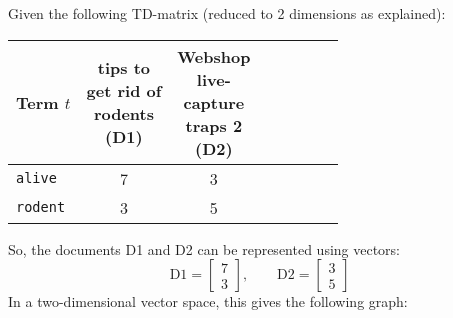         		Given the following TD-matrix (reduced to 2 dimensions as explained):
                \begin{table}[H]
                    \centering
                    \begin{tabular}{|l|c|c|c|c|c|c|c|}
                        \hline
                        \textbf{Term} \(t\) & \makecell{tips to \\ get rid of \\ rodents \\ (D1)} & \makecell{Webshop \\ live- \\ capture \\ traps 2 \\ (D2)} \\ \hline
                        \texttt{alive}  &         7          &         3          \\ \hline
                        \texttt{rodent} &         3          &         5          \\ \hline
                    \end{tabular}
                \end{table}
            	So, the documents D1 and D2 can be represented using vectors:
            	\begin{equation*}
                	\text{D1} =
                		\begin{bmatrix}
	                		7 \\
	                		3
                		\end{bmatrix},
                	\quad\quad
                	\text{D2} =
                		\begin{bmatrix}
	                		3 \\
	                		5
                		\end{bmatrix}
            	\end{equation*}
            	In a two-dimensional vector space, this gives the following graph:
            	\begin{figure}[H]
            		\centering
            	\end{figure}


